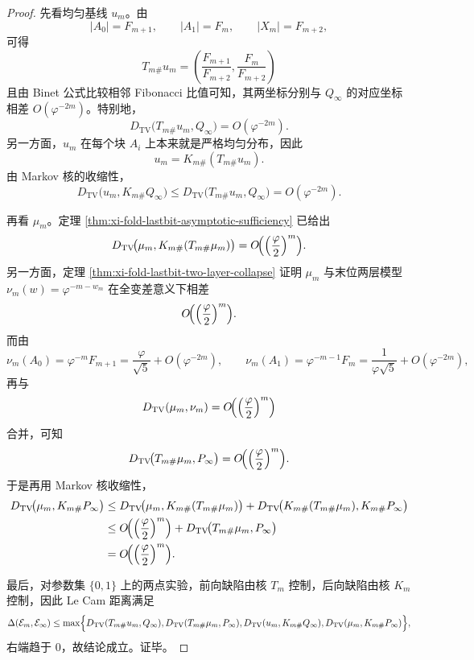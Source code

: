 \begin{proof}
先看均匀基线 \(u_m\)。由
\[
|A_0|=F_{m+1},
\qquad
|A_1|=F_m,
\qquad
|X_m|=F_{m+2},
\]
可得
\[
T_{m\#}u_m=
\left(\frac{F_{m+1}}{F_{m+2}},\frac{F_m}{F_{m+2}}\right)
\]
且由 Binet 公式比较相邻 Fibonacci 比值可知，其两坐标分别与 \(Q_\infty\) 的对应坐标相差 \(O(\varphi^{-2m})\)。特别地，
\[
D_{\mathrm{TV}}\!\bigl(T_{m\#}u_m,Q_\infty\bigr)=O(\varphi^{-2m}).
\]
另一方面，\(u_m\) 在每个块 \(A_i\) 上本来就是严格均匀分布，因此
\[
u_m=K_{m\#}(T_{m\#}u_m).
\]
由 Markov 核的收缩性，
\[
D_{\mathrm{TV}}\!\bigl(u_m,K_{m\#}Q_\infty\bigr)
\le
D_{\mathrm{TV}}\!\bigl(T_{m\#}u_m,Q_\infty\bigr)
=
O(\varphi^{-2m}).
\]

再看 \(\mu_m\)。定理 \ref{thm:xi-fold-lastbit-asymptotic-sufficiency} 已给出
\[
D_{\mathrm{TV}}\!\bigl(\mu_m,K_{m\#}(T_{m\#}\mu_m)\bigr)
=
O\!\Bigl(\Bigl(\frac{\varphi}{2}\Bigr)^m\Bigr).
\]
另一方面，定理 \ref{thm:xi-fold-lastbit-two-layer-collapse} 证明 \(\mu_m\) 与末位两层模型 \(\nu_m(w)=\varphi^{-m-w_m}\) 在全变差意义下相差
\[
O\!\Bigl(\Bigl(\frac{\varphi}{2}\Bigr)^m\Bigr).
\]
而由
\[
\nu_m(A_0)=\varphi^{-m}F_{m+1}=\frac{\varphi}{\sqrt5}+O(\varphi^{-2m}),
\qquad
\nu_m(A_1)=\varphi^{-m-1}F_m=\frac{1}{\varphi\sqrt5}+O(\varphi^{-2m}),
\]
再与
\[
D_{\mathrm{TV}}(\mu_m,\nu_m)=O\!\Bigl(\Bigl(\frac{\varphi}{2}\Bigr)^m\Bigr)
\]
合并，可知
\[
D_{\mathrm{TV}}\!\bigl(T_{m\#}\mu_m,P_\infty\bigr)
=
O\!\Bigl(\Bigl(\frac{\varphi}{2}\Bigr)^m\Bigr).
\]
于是再用 Markov 核收缩性，
\[
\begin{aligned}
D_{\mathrm{TV}}\!\bigl(\mu_m,K_{m\#}P_\infty\bigr)
&\le
D_{\mathrm{TV}}\!\bigl(\mu_m,K_{m\#}(T_{m\#}\mu_m)\bigr)
+
D_{\mathrm{TV}}\!\bigl(K_{m\#}(T_{m\#}\mu_m),K_{m\#}P_\infty\bigr)\\
&\le
O\!\Bigl(\Bigl(\frac{\varphi}{2}\Bigr)^m\Bigr)
+
D_{\mathrm{TV}}\!\bigl(T_{m\#}\mu_m,P_\infty\bigr)\\
&=
O\!\Bigl(\Bigl(\frac{\varphi}{2}\Bigr)^m\Bigr).
\end{aligned}
\]

最后，对参数集 \(\{0,1\}\) 上的两点实验，前向缺陷由核 \(T_m\) 控制，后向缺陷由核 \(K_m\) 控制，因此 Le Cam 距离满足
\[
\Delta(\mathcal E_m,\mathcal E_\infty)
\le
\max\Bigl\{
D_{\mathrm{TV}}(T_{m\#}u_m,Q_\infty),
D_{\mathrm{TV}}(T_{m\#}\mu_m,P_\infty),
D_{\mathrm{TV}}(u_m,K_{m\#}Q_\infty),
D_{\mathrm{TV}}(\mu_m,K_{m\#}P_\infty)
\Bigr\},
\]
右端趋于 \(0\)，故结论成立。证毕。
\end{proof}

